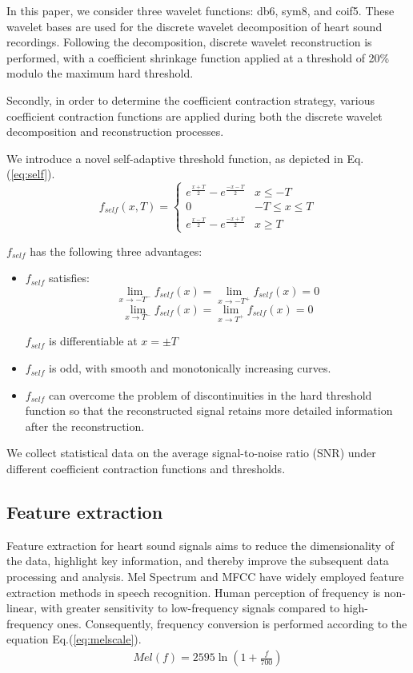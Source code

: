 In this paper, we consider three wavelet functions: db6, sym8, and coif5. These wavelet bases are used for the discrete wavelet decomposition of heart sound recordings. Following the decomposition, discrete wavelet reconstruction is performed, with a coefficient shrinkage function applied at a threshold of 20\% modulo the maximum hard threshold.

Secondly, in order to determine the coefficient contraction strategy, various coefficient contraction functions are applied during both the discrete wavelet decomposition and reconstruction processes. 

We introduce a novel self-adaptive threshold function, as depicted in Eq.(\ref{eq:self}).
\begin{equation}
f_{self}(x,T)=
	\begin{cases}
	e^{\frac{x+T}{2}}-e^{\frac{-x-T}{2}}&x \leq -T\\ 
	0& -T \leq x \leq T\\
	e^{\frac{x-T}{2}}-e^{\frac{-x+T}{2}}&x \geq T
	\end{cases}
	\label{eq:self}
\end{equation}

$f_{self}$ has the following three advantages:
\begin{itemize}
\item $f_{self}$ satisfies: $$\lim_{x \to -T^-}f_{self}(x)=\lim_{x \to -T^+}f_{self}(x)=0$$ $$\lim_{x \to T^-}f_{self}(x)=\lim_{x \to T^+}f_{self}(x)=0$$ 

$f_{self}$ is differentiable at $x=\pm T$
\item $f_{self}$ is odd, with smooth and monotonically increasing curves.
\item $f_{self}$ can overcome the problem of discontinuities in the hard threshold function so that the reconstructed signal retains more detailed information after the reconstruction.
\end{itemize}

We collect statistical data on the average signal-to-noise ratio (SNR) under different coefficient contraction functions and thresholds.
\subsection{Feature extraction}
Feature extraction for heart sound signals aims to reduce the dimensionality of the data, highlight key information, and thereby improve the subsequent data processing and analysis. Mel Spectrum and MFCC have widely employed feature extraction methods in speech recognition. Human perception of frequency is non-linear, with greater sensitivity to low-frequency signals compared to high-frequency ones. Consequently, frequency conversion is performed according to the equation Eq.(\ref{eq:melscale}).
\begin{equation}
	\begin{aligned}
Mel(f)=2595\ln \left(1+\frac{f}{700} \right)
\label{eq:melscale}
	\end{aligned}
\end{equation}

